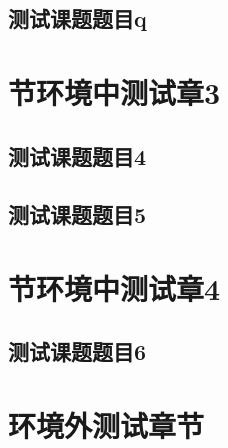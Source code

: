 \documentclass[color=green]{textbook-cn}%
\begin{document}
\begin{Project}

\makeatletter

\section{测试课题题目q}


\chapter{节环境中测试章3}


\section{测试课题题目4}

\begin{Definition}[定义名称]
\lipsum[1]
\end{Definition}


\section{测试课题题目5}

\begin{Definition}[定义名称]
\lipsum[1]
\end{Definition}


\chapter{节环境中测试章4}


\section{测试课题题目6}

\begin{Definition}[定义名称]
\lipsum[1]
\end{Definition}

\makeatother

\end{Project}





\chapter{环境外测试章节}
\end{document}
